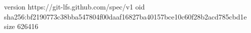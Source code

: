 version https://git-lfs.github.com/spec/v1
oid sha256:bf2190773c38bba547804f00daaf16827ba40157bce10c60f28b2acd785cbd1e
size 626416
